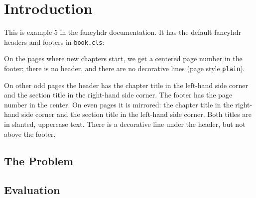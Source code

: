 \documentclass{book}
\begin{document}
\chapter{Introduction}

\begin{boxedminipage}{\textwidth}
This is example 5 in the fancyhdr documentation. It has the default fancyhdr headers and footers in \texttt{book.cls}:

On the pages where new chapters start, we get a centered page number in
the footer; there is no header, and there are no decorative lines (page style \texttt{plain}).

On other odd pages the header has the chapter title in the left-hand side corner and the section title in the right-hand side corner. The footer has the page number in the center. On even pages it is mirrored:  the chapter title in the right-hand side corner and the section title in the left-hand side corner. Both titles are in slanted, uppercase text. There is a decorative line under the header, but not above the footer.
\end{boxedminipage}

\section{The Problem}
\label{sec:problem}

\lipsum[1]

\section{Evaluation}

\lipsum
\end{document}
